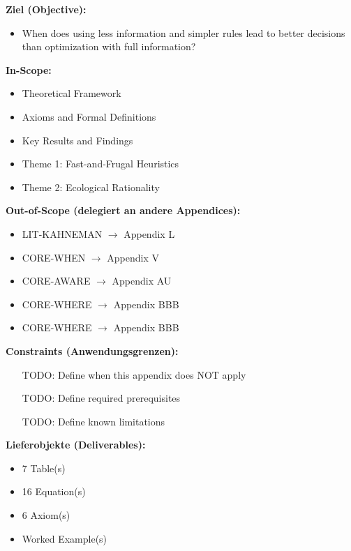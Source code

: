 \begin{tcolorbox}[
    colback=orange!5!white,
    colframe=orange!75!black,
    title={\textbf{Appendix Scope: Ziel / In-Scope / Out-of-Scope / Constraints}},
    fonttitle=\bfseries
]

\textbf{Ziel (Objective):}
\begin{itemize}[nosep]
    \item When does using less information and simpler rules lead to better decisions than optimization with full information?
\end{itemize}

\textbf{In-Scope:}
\begin{itemize}[nosep]
    \item Theoretical Framework
    \item Axioms and Formal Definitions
    \item Key Results and Findings
    \item Theme 1: Fast-and-Frugal Heuristics
    \item Theme 2: Ecological Rationality
\end{itemize}

\textbf{Out-of-Scope (delegiert an andere Appendices):}
\begin{itemize}[nosep]
    \item LIT-KAHNEMAN $\rightarrow$ Appendix L
    \item CORE-WHEN $\rightarrow$ Appendix V
    \item CORE-AWARE $\rightarrow$ Appendix AU
    \item CORE-WHERE $\rightarrow$ Appendix BBB
    \item CORE-WHERE $\rightarrow$ Appendix BBB
\end{itemize}

\textbf{Constraints (Anwendungsgrenzen):}
\begin{itemize}[nosep]
    \item [TODO: Define when this appendix does NOT apply]
    \item [TODO: Define required prerequisites]
    \item [TODO: Define known limitations]
\end{itemize}

\textbf{Lieferobjekte (Deliverables):}
\begin{itemize}[nosep]
    \item 7 Table(s)
    \item 16 Equation(s)
    \item 6 Axiom(s)
    \item Worked Example(s)
\end{itemize}

\end{tcolorbox}




